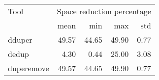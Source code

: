 \begin{tabular}{lrrrr}
\toprule
Tool & \multicolumn{4}{r}{Space reduction percentage} \\
 & mean & min & max & std \\
\midrule
dduper & 49.57 & 44.65 & 49.90 & 0.77 \\
dedup & 4.30 & 0.44 & 25.00 & 3.08 \\
duperemove & 49.57 & 44.65 & 49.90 & 0.77 \\
\bottomrule
\end{tabular}

